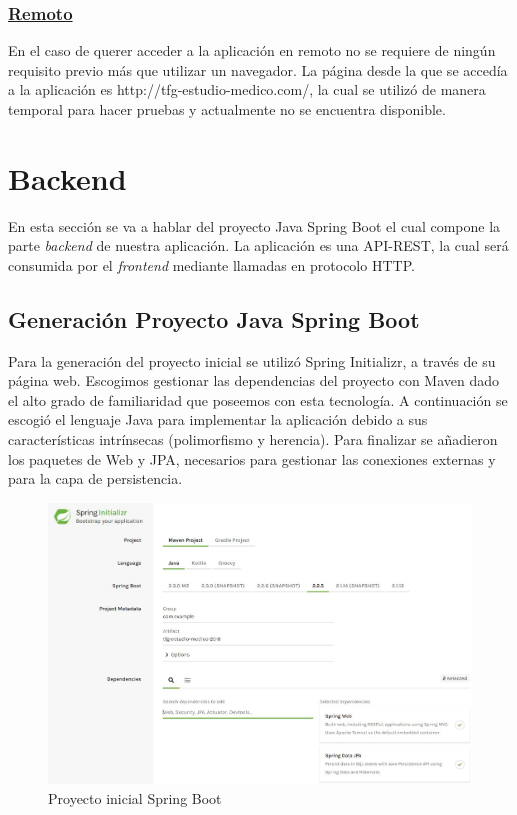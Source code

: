         \subsubsection{\underline{Remoto}}
        En el caso de querer acceder a la aplicación en remoto no se requiere de ningún requisito previo más que utilizar un navegador. La página desde la que se accedía a la aplicación es http://tfg-estudio-medico.com/, la cual se utilizó de manera temporal para hacer pruebas y actualmente no se encuentra disponible. 
    
    
    \section{Backend}
    
     En esta sección se va a hablar del proyecto Java Spring Boot el cual compone la parte \textit{backend} de nuestra aplicación. La aplicación es una API-REST, la cual será consumida por el \textit{frontend} mediante llamadas en protocolo HTTP. 
     
     
    \subsection{Generación Proyecto Java Spring Boot}
    Para la generación del proyecto inicial se utilizó Spring Initializr\cite{springinitializr}, a través de su página web. Escogimos gestionar las dependencias del proyecto con Maven dado el alto grado de familiaridad que poseemos con esta tecnología. A continuación se escogió el lenguaje Java para implementar la aplicación debido a sus características intrínsecas (polimorfismo y herencia). Para finalizar se añadieron los paquetes de Web y JPA, necesarios para gestionar las conexiones externas y para la capa de persistencia.
    
    \begin{figure}[h]
    \centering
     \includegraphics[width=1\textwidth]{images/springstarter}
    \caption{Proyecto inicial Spring Boot}
    \end{figure}
    
